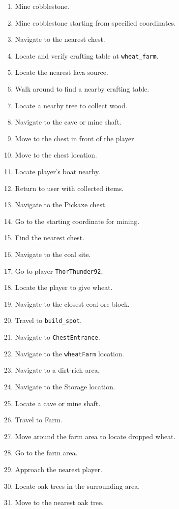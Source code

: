 \begin{small}
\begin{enumerate}
  \item Mine cobblestone.
  \item Mine cobblestone starting from specified coordinates.
  \item Navigate to the nearest chest.
  \item Locate and verify crafting table at \texttt{wheat\_farm}.
  \item Locate the nearest lava source.
  \item Walk around to find a nearby crafting table.
  \item Locate a nearby tree to collect wood.
  \item Navigate to the cave or mine shaft.
  \item Move to the chest in front of the player.
  \item Move to the chest location.
  \item Locate player's boat nearby.
  \item Return to user with collected items.
  \item Navigate to the Pickaxe chest.
  \item Go to the starting coordinate for mining.
  \item Find the nearest chest.
  \item Navigate to the coal site.
  \item Go to player \texttt{ThorThunder92}.
  \item Locate the player to give wheat.
  \item Navigate to the closest coal ore block.
  \item Travel to \texttt{build\_spot}.
  \item Navigate to \texttt{ChestEntrance}.
  \item Navigate to the \texttt{wheatFarm} location.
  \item Navigate to a dirt-rich area.
  \item Navigate to the Storage location.
  \item Locate a cave or mine shaft.
  \item Travel to Farm.
  \item Move around the farm area to locate dropped wheat.
  \item Go to the farm area.
  \item Approach the nearest player.
  \item Locate oak trees in the surrounding area.
  \item Move to the nearest oak tree.

\end{enumerate}
\end{small}
